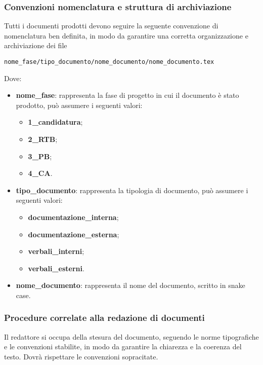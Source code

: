 \subsubsection{Convenzioni nomenclatura e struttura di archiviazione}
Tutti i documenti prodotti devono seguire la seguente convenzione di nomenclatura ben definita, in modo da garantire una corretta organizzazione e archiviazione dei file
\begin{center}
	\texttt{nome\_fase/tipo\_documento/nome\_documento/nome\_documento.tex}
\end{center}
Dove:
\begin{itemize}
	\item \textbf{nome\_fase}: rappresenta la fase di progetto in cui il documento è stato prodotto, può assumere i seguenti valori:
	      \begin{itemize}
		      \item \textbf{1\_candidatura};
		      \item \textbf{2\_RTB};
		      \item \textbf{3\_PB};
		      \item \textbf{4\_CA}.
	      \end{itemize}
	\item \textbf{tipo\_documento}: rappresenta la tipologia di documento, può assumere i seguenti valori:
	      \begin{itemize}
		      \item \textbf{documentazione\_interna};
		      \item \textbf{documentazione\_esterna};
		      \item \textbf{verbali\_interni};
		      \item \textbf{verbali\_esterni}.
	      \end{itemize}
	\item \textbf{nome\_documento}: rappresenta il nome del documento, scritto in snake case.
\end{itemize}

\subsubsection{Procedure correlate alla redazione di documenti}
Il redattore si occupa della stesura del documento, seguendo le norme tipografiche e le convenzioni stabilite, in modo da garantire la
chiarezza e la coerenza del testo. Dovrà rispettare le convenzioni sopracitate.

